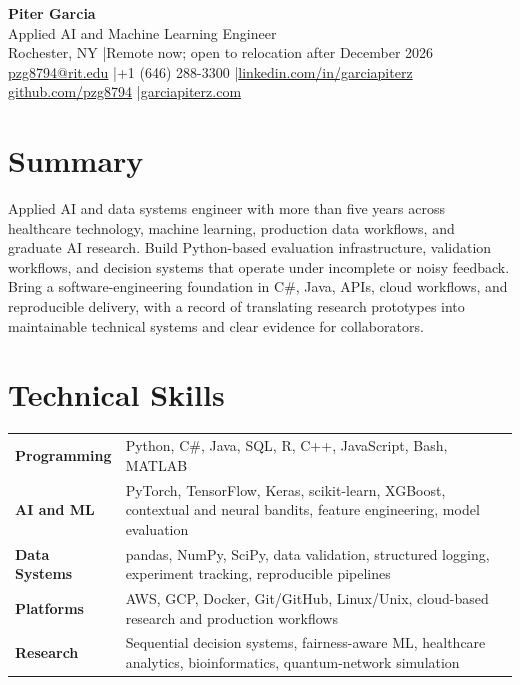 \documentclass[10pt,letterpaper]{article}
\begin{document}
\fontsize{8.8}{10.1}\selectfont

\begin{center}
  {\Large\bfseries Piter Garcia}\\[1pt]
  {\large Applied AI and Machine Learning Engineer}\\[2pt]
  Rochester, NY \enspace|\enspace Remote now; open to relocation after December 2026\\
  \href{mailto:pzg8794@rit.edu}{pzg8794@rit.edu}
  \enspace|\enspace +1 (646) 288-3300
  \enspace|\enspace \href{https://linkedin.com/in/garciapiterz}{linkedin.com/in/garciapiterz}\\
  \href{https://github.com/pzg8794}{github.com/pzg8794}
  \enspace|\enspace \href{https://garciapiterz.com}{garciapiterz.com}
\end{center}

\section*{Summary}
Applied AI and data systems engineer with more than five years across healthcare
technology, machine learning, production data workflows, and graduate AI
research. Build Python-based evaluation infrastructure, validation workflows,
and decision systems that operate under incomplete or noisy feedback. Bring a
software-engineering foundation in C\#, Java, APIs, cloud workflows, and
reproducible delivery, with a record of translating research prototypes into
maintainable technical systems and clear evidence for collaborators.

\section*{Technical Skills}
\begin{tabularx}{\textwidth}{@{}>{\bfseries}l X@{}}
Programming & Python, C\#, Java, SQL, R, C++, JavaScript, Bash, MATLAB\\
AI and ML & PyTorch, TensorFlow, Keras, scikit-learn, XGBoost, contextual and neural bandits, feature engineering, model evaluation\\
Data Systems & pandas, NumPy, SciPy, data validation, structured logging, experiment tracking, reproducible pipelines\\
Platforms & AWS, GCP, Docker, Git/GitHub, Linux/Unix, cloud-based research and production workflows\\
Research & Sequential decision systems, fairness-aware ML, healthcare analytics, bioinformatics, quantum-network simulation\\
\end{tabularx}
\end{document}
